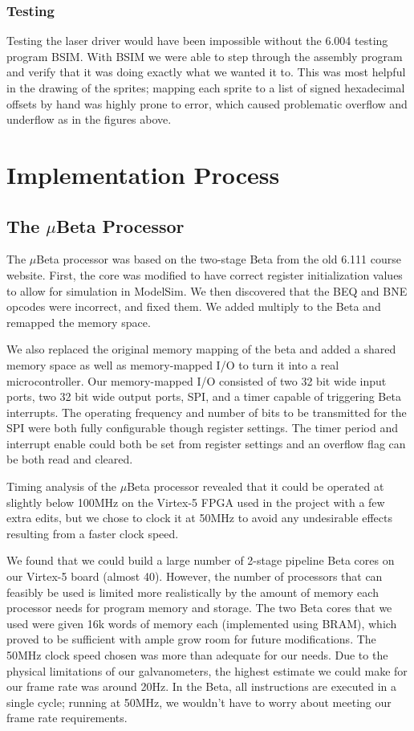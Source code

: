 \documentclass{article}
\begin{document}
\subsubsection{Testing}

Testing the laser driver would have been impossible without the 6.004 testing program BSIM. With BSIM we were able to step through the assembly program and verify that it was doing exactly what we wanted it to. This was most helpful in the drawing of the sprites; mapping each sprite to a list of signed hexadecimal offsets by hand was highly prone to error, which caused problematic overflow and underflow as in the figures above. 

\section{Implementation Process} \label{implementation}
\subsection{The $\mu$Beta Processor} \label{mbeta}
The $\mu$Beta processor was based on the two-stage Beta from the old 6.111 course website.  First, the core was modified to have correct register initialization values to allow for simulation in ModelSim. We then discovered that the BEQ and BNE opcodes were incorrect, and fixed them. We added multiply to the Beta and remapped the memory space. 

We also replaced the original memory mapping of the beta and added a shared memory space as well as memory-mapped I/O to turn it into a real microcontroller. Our memory-mapped I/O consisted of two 32 bit wide input ports, two 32 bit wide output ports, SPI, and a timer capable of triggering Beta interrupts. The operating frequency and number of bits to be transmitted for the SPI were both fully configurable though register settings. The timer period and interrupt enable could both be set from register settings and an overflow flag can be both read and cleared. 

Timing analysis of the $\mu$Beta processor revealed that it could be operated at slightly below 100MHz on the Virtex-5 FPGA used in the project with a few extra edits, but we chose to clock it at 50MHz to avoid any undesirable effects resulting from a faster clock speed. 

We found that we could build a large number of 2-stage pipeline Beta cores on our Virtex-5 board (almost 40). However, the number of processors that can feasibly be used is limited more realistically by the amount of memory each processor needs for program memory and storage. The two Beta cores that we used were given 16k words of memory each (implemented using BRAM), which proved to be sufficient with ample grow room for future modifications. The 50MHz clock speed chosen was more than adequate for our needs. Due to the physical limitations of our galvanometers, the highest estimate we could make for our frame rate was around 20Hz. In the Beta, all instructions are executed in a single cycle; running at 50MHz, we wouldn't have to worry about meeting our frame rate requirements.
\end{document}
